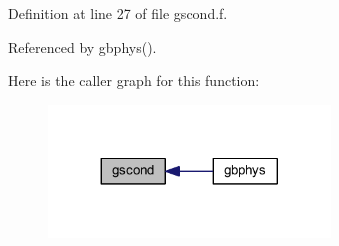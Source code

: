 Definition at line 27 of file gscond.\+f.



Referenced by gbphys().



Here is the caller graph for this function\+:\nopagebreak
\begin{figure}[H]
\begin{center}
\leavevmode
\includegraphics[width=212pt]{gscond_8f_a02cb3895f68b86a4b7e259c8c098ecc1_icgraph}
\end{center}
\end{figure}


